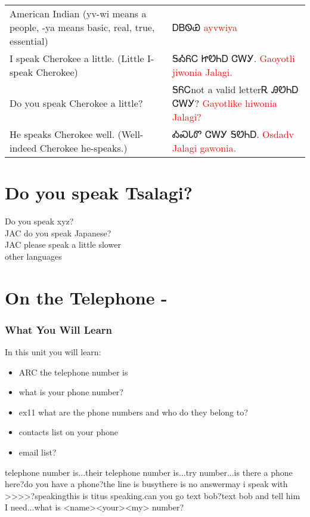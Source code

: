 \begin{multicols}
\begin{minipage}{\linewidth}
\begin{tabular}{p{5cm} p{9cm}}
American Indian (yv-wi means a people, -ya means basic, real, true, essential) & ᎠᏴᏫᏯ 
 \newline \textcolor{red}{ayvwiya}\\
I speak Cherokee a little. (Little I-speak Cherokee) & ᎦᎣᏲᏟ ᏥᏬᏂᎠ ᏣᎳᎩ. 
 \newline \textcolor{red}{Gaoyotli jiwonia Jalagi.}\\
Do you speak Cherokee a little? & ᎦᏲᏟnot a valid letterᎡ ᎯᏬᏂᎠ ᏣᎳᎩ? 
 \newline \textcolor{red}{Gayotlike hiwonia Jalagi?}\\
He speaks Cherokee well. (Well-indeed Cherokee he-speaks.) & ᎣᏍᏓᏛ ᏣᎳᎩ ᎦᏬᏂᎠ. 
 \newline \textcolor{red}{Osdadv Jalagi gawonia.}\\
\end{tabular}
\end{minipage}

\chapter{Do you speak Tsalagi?}
Do you speak xyz?\\
JAC do you speak Japanese?\\
JAC please speak a little slower\\
other languages\\
\index{}
\chapter{On the Telephone - }
\subsection{What You Will Learn}
In this unit you will learn:
\begin{itemize}
\item ARC the telephone number is
\item what is your phone number?
\item ex11 what are the phone numbers and who do they belong to?
\item contacts list on your phone
\item email list?
\end{itemize}\newpage

\newpageMy telephone number is...their telephone number is...try number...is there a phone here?do you have a phone?the line is busythere is no answermay i speak with >>>>?speakingthis is titus speaking.can you go text bob?text bob and tell him I need...what is <name><your><my> number?
\index{}

\end{multicols}

